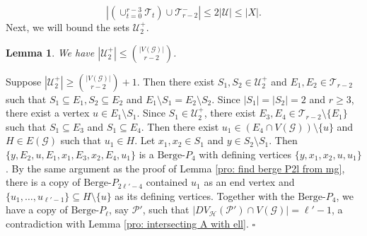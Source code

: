 \documentclass[12pt]{article}%
\newtheorem{lemma}[theorem]{Lemma}
\newenvironment{proof}{{\noindent\it Proof.}}{\hfill $\square$\par}
\newcommand{\ber}{\text{Berge-}}
\newcommand{\mh}{\mathcal{H}}
\newcommand{\mg}{\mathcal{G}}
\begin{document}
$$\left|\left(\cup_{t=0}^{r-3} \mathcal{T}_t\right)\cup \mathcal{T}_{r-2}^-\right|\leq 2|\mathcal{U}|\leq |X|.$$
Next, we will bound the sets $\mathcal{U}_2^+$.
\begin{lemma}\label{lem: U_2^+}
    We have $\left|\mathcal{U}_2^+\right|\leq \binom{|V(\mg)|}{r-2}$.
\end{lemma}
\begin{proof}
 Suppose $|\mathcal{U}_{2}^{+}|\geq \binom{|V(\mg)|}{r-2}+1$. Then there exist $S_1,S_2\in \mathcal{U}_{2}^{+}$ and  $E_1,E_2\in \mathcal{T}_{r-2}$ such that $S_1\subseteq E_1, S_2\subseteq E_2$ and $E_1\setminus S_1=E_2\setminus S_2$. Since $|S_1|=|S_2|=2$ and $r\geq 3$, there exist a vertex $u\in E_1\setminus S_1$. Since $S_1\in\mathcal{U}_{2}^{+}$, there exist  $E_3,E_4\in \mathcal{T}_{r-2}\setminus\{E_1\}$ such that $S_1\subseteq E_3$   and $S_1\subseteq E_4$. Then there exist  $u_1\in (E_4\cap V(\mg))\setminus\{u\}$ and  $H\in E(\mg)$ such that $u_1\in H$.
Let $x_1,x_2\in S_1$ and $y\in S_2\setminus S_1$. Then $\{y,E_2,u,E_1,x_1,E_3,x_2,E_4,u_1\}$ is a  $\ber P_{4}$ with defining vertices $\{y,x_1,x_2,u,u_1\}$.
  By the same argument as the proof of Lemma \ref{pro: find berge P2l from mg}, there is a copy of $\ber P_{2\ell'-4}$ contained $u_1$ as an end vertex and $\{u_1,\ldots,u_{\ell'-1}\}\subseteq H\setminus\{u\}$ as its defining vertices. Together with the $\ber P_{4}$, we have a copy of $\ber P_{\ell}$, say $\mathcal{P}'$, such that $|DV_\mh(\mathcal{P}')\cap V(\mg)|=\ell'-1$, a contradiction with Lemma \ref{pro: intersecting A with ell}.
\end{proof}
\end{document}

